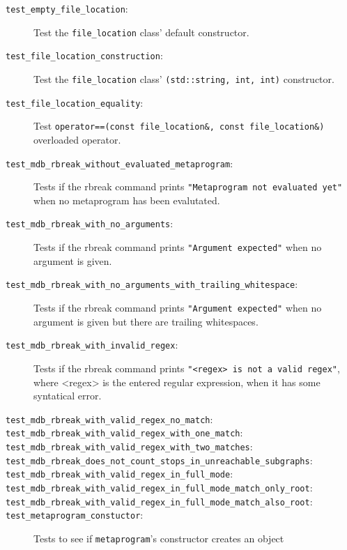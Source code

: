 \begin{description}
    \item[\texttt{test\_empty\_file\_location}:]
        Test the \texttt{file\_location} class' default constructor.
    \item[\texttt{test\_file\_location\_construction}:]
        Test the \texttt{file\_location} class'
        \texttt{(std::string, int, int)} constructor.
    \item[\texttt{test\_file\_location\_equality}:]
        Test \texttt{operator==(const file\_location\&, const file\_location\&)}
        overloaded operator.
    \item[\texttt{test\_mdb\_rbreak\_without\_evaluated\_metaprogram}:]
        Tests if the rbreak command prints
        \texttt{"Metaprogram not evaluated yet"} when no metaprogram has been
        evalutated.
    \item[\texttt{test\_mdb\_rbreak\_with\_no\_arguments}:]
        Tests if the rbreak command prints
        \texttt{"Argument expected"} when no argument is given.
    \item[\texttt{test\_mdb\_rbreak\_with\_no\_arguments\_with\_trailing\_whitespace}:]
        Tests if the rbreak command prints
        \texttt{"Argument expected"} when no argument is given but there are
        trailing whitespaces.
    \item[\texttt{test\_mdb\_rbreak\_with\_invalid\_regex}:]
        Tests if the rbreak command prints
        \texttt{"<regex> is not a valid regex"}, where <regex> is the entered
        regular expression, when it has some syntatical error.
    \item[\texttt{test\_mdb\_rbreak\_with\_valid\_regex\_no\_match}:]
    \item[\texttt{test\_mdb\_rbreak\_with\_valid\_regex\_with\_one\_match}:]
    \item[\texttt{test\_mdb\_rbreak\_with\_valid\_regex\_with\_two\_matches}:]
    \item[\texttt{test\_mdb\_rbreak\_does\_not\_count\_stops\_in\_unreachable\_subgraphs}:]
    \item[\texttt{test\_mdb\_rbreak\_with\_valid\_regex\_in\_full\_mode}:]
    \item[\texttt{test\_mdb\_rbreak\_with\_valid\_regex\_in\_full\_mode\_match\_only\_root}:]
    \item[\texttt{test\_mdb\_rbreak\_with\_valid\_regex\_in\_full\_mode\_match\_also\_root}:]
    \item[\texttt{test\_metaprogram\_constuctor}:]
        Tests to see if \texttt{metaprogram}'s constructor creates an object

\end{description}
